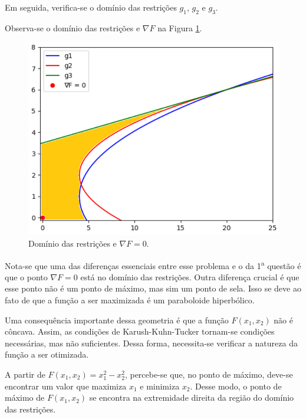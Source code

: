 \documentclass{article}
\begin{document}
     \vspace{0.6cm}
     
    Em seguida, verifica-se o domínio das restrições $g_{1}$, $g_{2}$ e $g_{3}$. 
    
    Observa-se o domínio das restrições e $\nabla F$ na Figura \ref{g1-g2-g3-F-r}.
    
        \begin{figure}[H]
            \centering
            \includegraphics[scale=1]{g1-g2-g3-F-r.png}
            \caption{Domínio das restrições e $\nabla F = 0$.}
            \label{g1-g2-g3-F-r}
        \end{figure}
    
    Nota-se que uma das diferenças essenciais entre esse problema e o da 1\textsuperscript{a} questão é que o ponto $\nabla F = 0$ está no domínio das restrições. Outra diferença crucial é que esse ponto não é um ponto de máximo, mas sim um ponto de sela. Isso se deve ao fato de que a função a ser maximizada é um paraboloide hiperbólico.
    
    Uma consequência importante dessa geometria é que a função $F(x_{1}, x_{2})$ não é côncava. Assim, as condições de Karush-Kuhn-Tucker tornam-se condições necessárias, mas não suficientes. Dessa forma, necessita-se verificar a natureza da função a ser otimizada. 
    
    A partir de $F(x_{1}, x_{2}) = x_{1}^2 - x_{2}^2$, percebe-se que, no ponto de máximo, deve-se encontrar um valor que maximiza $x_{1}$ e minimiza $x_{2}$. Desse modo, o ponto de máximo de $F(x_{1}, x_{2})$ se encontra na extremidade direita da região do domínio das restrições. 
    
\end{document}
